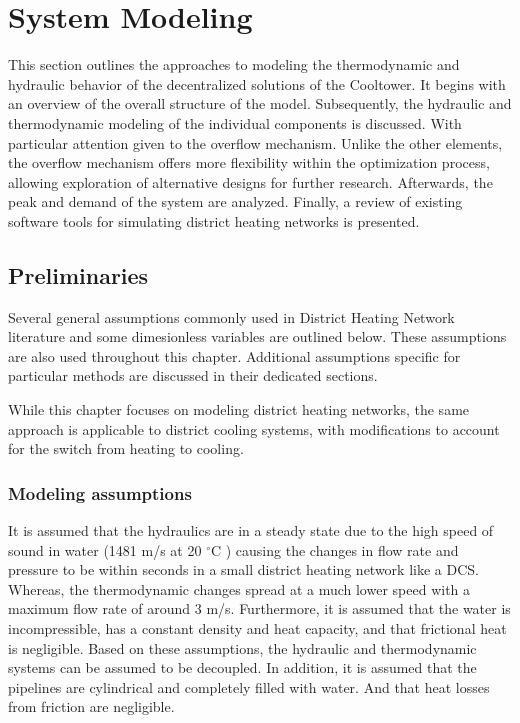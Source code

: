 \chapter{System Modeling}\label{chap::sysmodel}
This section outlines the approaches to modeling the thermodynamic and hydraulic behavior of the decentralized solutions of the Cooltower. It begins with an overview of the overall structure of the model. Subsequently, the hydraulic and thermodynamic modeling of the individual components is discussed. With particular attention given to the overflow mechanism. Unlike the other elements, the overflow mechanism offers more flexibility within the optimization process, allowing exploration of alternative designs for further research. Afterwards, the peak and demand of the system are analyzed. Finally, a review of existing software tools for simulating district heating networks is presented. 

\section{Preliminaries}\label{sec::preliminaries}
Several general assumptions commonly used in District Heating Network literature and some dimesionless variables are outlined below. These assumptions are also used throughout this chapter. Additional assumptions specific for particular methods are discussed in their dedicated sections.

While this chapter focuses on modeling district heating networks, the same approach is applicable to district cooling systems, with modifications to account for the switch from heating to cooling.

\subsection{Modeling assumptions}
It is assumed that the hydraulics are in a steady state due to the high speed of sound in water (1481 m/s at 20 $^{\circ}\text{C}$ \cite{speedofsound}) causing the changes in flow rate and pressure to be within seconds in a small district heating network like a DCS. Whereas, the thermodynamic changes spread at a much lower speed with a maximum flow rate of around 3 m/s. Furthermore, it is assumed that the water is incompressible, has a constant density and heat capacity, and that frictional heat is negligible. Based on these assumptions, the hydraulic and thermodynamic systems can be assumed to be decoupled. In addition, it is assumed that the pipelines are cylindrical and completely filled with water. And that heat losses from friction are negligible. 

